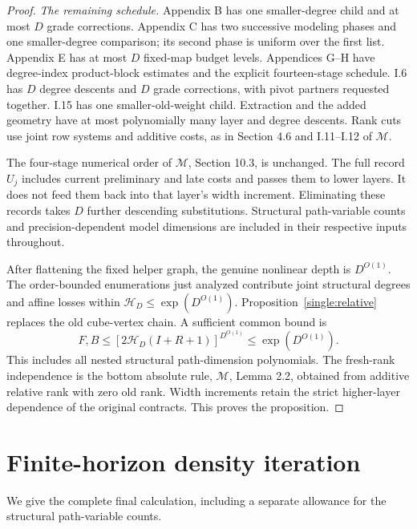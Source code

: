 \documentclass[11pt,a4paper]{article}
\theoremstyle{definition}
\newcommand{\M}{\mathcal M}
\begin{document}
\begin{proof}
\textit{The remaining schedule.}
Appendix B has one smaller-degree child and at most \(D\) grade
corrections. Appendix C has two successive modeling phases and
one smaller-degree comparison; its second phase is uniform over
the first list. Appendix E has at most \(D\) fixed-map budget
levels. Appendices G--H have degree-index product-block estimates
and the explicit fourteen-stage schedule. I.6 has \(D\) degree
descents and \(D\) grade corrections, with pivot partners requested
together. I.15 has one smaller-old-weight child. Extraction and
the added geometry have at most polynomially many layer and
degree descents. Rank cuts use joint row systems and additive
costs, as in Section 4.6 and I.11--I.12 of \(\M\).

The four-stage numerical order of \(\M\), Section 10.3, is
unchanged. The full record \(U_j\) includes current preliminary
and late costs and passes them to lower layers. It does not feed
them back into that layer's width increment. Eliminating these
records takes \(D\) further descending substitutions. Structural
path-variable counts and precision-dependent model dimensions
are included in their respective inputs throughout.

After flattening the fixed helper graph, the genuine nonlinear
depth is \(D^{O(1)}\). The order-bounded enumerations just
analyzed contribute joint structural degrees and affine losses
within \(\mathcal H_D\le\exp(D^{O(1)})\). Proposition~\ref{single:relative}
replaces the old cube-vertex chain. A sufficient common bound is
\begin{equation}\label{eq:local-bound}
 F,B\le[2\mathcal H_D(I+R+1)]^{D^{O(1)}}
       \le\exp(D^{O(1)}).
\end{equation}
This includes all nested structural path-dimension polynomials.
The fresh-rank independence is the bottom absolute rule,
\(\M\), Lemma 2.2, obtained from additive relative rank with
zero old rank. Width increments retain the strict higher-layer
dependence of the original contracts. This proves the proposition.
\end{proof}


\section{Finite-horizon density iteration}\label{sec:iteration}
We give the complete final calculation, including a separate allowance
for the structural path-variable counts.
\end{document}
